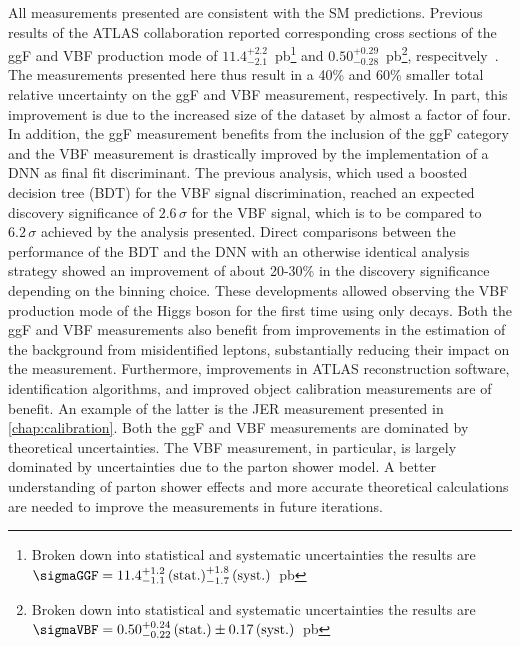 All measurements presented are consistent with the SM predictions. 
Previous \RunTwo results of the ATLAS collaboration reported corresponding cross sections of the ggF and VBF production mode of $11.4^{+2.2}_{-2.1}$~pb\footnote{Broken down into statistical and systematic uncertainties the results are $\sigmaGGF = 11.4^{+1.2}_{-1.1}\,\text{(stat.)}^{+1.8}_{-1.7}\,\text{(syst.)}$~pb} and $0.50^{+0.29}_{-0.28}$~pb\footnote{Broken down into statistical and systematic uncertainties the results are  $\sigmaVBF= 0.50^{+0.24}_{-0.22}\,\text{(stat.)}\pm 0.17\,\text{(syst.)}$~pb}, respecitvely~\cite{HIGG-2016-07}.
The measurements presented here thus result in a 40\% and 60\% smaller total relative uncertainty on the ggF and VBF measurement, respectively. In part, this improvement is due to the increased size of the dataset by almost a factor of four.
In addition, the ggF measurement benefits from the inclusion of the ggF \TwoJet category and the VBF measurement is drastically improved by the implementation of a DNN as final fit discriminant. 
The previous analysis, which used a boosted decision tree (BDT) for the VBF signal discrimination, reached an expected discovery significance of $2.6\,\sigma$ for the VBF signal, which is to be compared to $6.2\,\sigma$ achieved by the analysis presented. 
Direct comparisons between the performance of the BDT and the DNN with an otherwise identical analysis strategy showed an improvement of about 20-30\% in the discovery significance depending on the binning choice. %
These developments allowed observing the VBF production mode of the Higgs boson for the first time using only \HWW decays.
Both the ggF and VBF measurements also benefit from improvements in the estimation of the background from misidentified leptons, substantially reducing their impact on the measurement. 
Furthermore, improvements in ATLAS reconstruction software, identification algorithms, and improved object calibration measurements are of benefit. 
An example of the latter is the JER measurement presented in \cref{chap:calibration}. 
Both the ggF and VBF measurements are dominated by theoretical uncertainties. 
The VBF measurement, in particular, is largely dominated by uncertainties due to the parton shower model. 
A better understanding of parton shower effects and more accurate theoretical calculations are needed to improve the measurements in future iterations.~\cite{J_ger_2020} 

